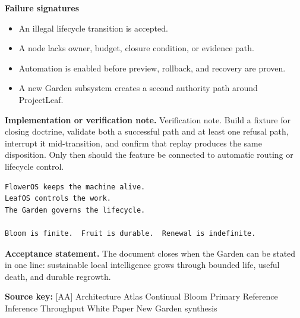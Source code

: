 \documentclass[10pt,letterpaper,oneside]{article}
\begin{document}
\textbf{Failure signatures}
\begin{itemize}
\item An illegal lifecycle transition is accepted.
\item A node lacks owner, budget, closure condition, or evidence path.
\item Automation is enabled before preview, rollback, and recovery are proven.
\item A new Garden subsystem creates a second authority path around ProjectLeaf.
\end{itemize}
\textbf{Implementation or verification note.} Verification note. Build a fixture for closing doctrine, validate both a successful path and at least one refusal path, interrupt it mid-transition, and confirm that replay produces the same disposition. Only then should the feature be connected to automatic routing or lifecycle control.

\begin{lstlisting}
FlowerOS keeps the machine alive.
LeafOS controls the work.
The Garden governs the lifecycle.

Bloom is finite.  Fruit is durable.  Renewal is indefinite.
\end{lstlisting}
\begin{acceptbox}
\textbf{Acceptance statement.} The document closes when the Garden can be stated in one line: sustainable local intelligence grows through bounded life, useful death, and durable regrowth.
\end{acceptbox}

\vfill
\begin{center}
\sffamily\small
\textbf{Source key:} [AA] Architecture Atlas \quad [CB] Continual Bloom Primary Reference \quad [TP] Inference Throughput White Paper \quad [G] New Garden synthesis
\end{center}
\end{document}

